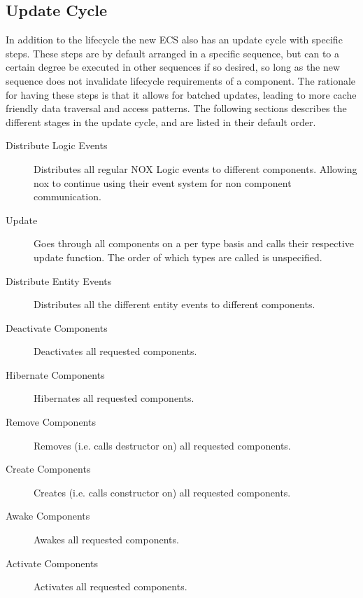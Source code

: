 \subsection{Update Cycle}
\label{subsec:high_level_update_cycle}
In addition to the lifecycle the new ECS also has an update cycle with specific steps.
These steps are by default arranged in a specific sequence, but can to a certain degree
be executed in other sequences if so desired,
so long as the new sequence does not invalidate lifecycle requirements of a component.
The rationale for having these steps is that it allows for batched updates,
leading to more cache friendly data traversal and access patterns.
The following sections describes the different stages in the update cycle,
and are listed in their default order.

\begin{description}
    \item
    [Distribute Logic Events]
    Distributes all regular NOX Logic events to different components.
    Allowing nox to continue using their event system for non component communication.

    \item
    [Update]
    Goes through all components on a per type basis and calls their respective update function.
    The order of which types are called is unspecified.

    \item
    [Distribute Entity Events]
    Distributes all the different entity events to different components.

    \item
    [Deactivate Components]
    Deactivates all requested components.

    \item
    [Hibernate Components]
    Hibernates all requested components.

    \item
    [Remove Components]
    Removes (i.e. calls destructor on) all requested components.

    \item
    [Create Components]
    Creates (i.e. calls constructor on) all requested components.

    \item
    [Awake Components]
    Awakes all requested components.

    \item
    [Activate Components]
    Activates all requested components.
\end{description}

